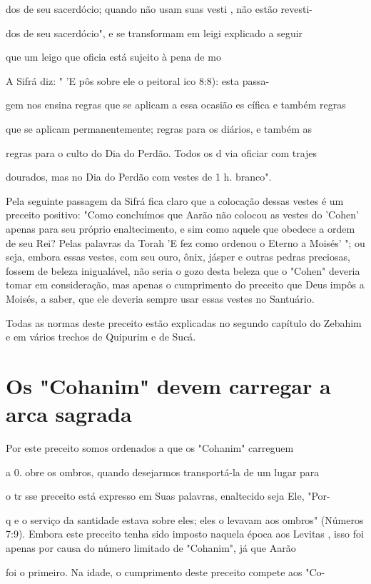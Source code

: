 \begin{itemize}
\begin{enumrate}
\begin{itemize}
\begin{itemize}
dos de seu sacerdócio; quando não usam suas vesti , não estão revesti-

dos de seu sacerdócio", e se transformam em leigi explicado a seguir

que um leigo que oficia está sujeito à pena de mo

A Sifrá diz: " 'E pôs sobre ele o peitoral ico 8:8): esta passa-


gem nos ensina regras que se aplicam a essa ocasião es cífica e também
regras


que se aplicam permanentemente; regras para os diários, e também as

regras para o culto do Dia do Perdão. Todos os d via oficiar com trajes

dourados, mas no Dia do Perdão com vestes de 1 h. branco".

Pela seguinte passagem da Sifrá fica claro que a colocação dessas
ves­tes é um preceito positivo: "Como concluímos que Aarão não colocou
as ves­tes do 'Cohen' apenas para seu próprio enaltecimento, e sim como
aquele que obedece a ordem de seu Rei? Pelas palavras da Torah 'E fez
como ordenou o Eterno a Moisés' "; ou seja, embora essas vestes, com seu
ouro, ônix, jásper e outras pedras preciosas, fossem de beleza
inigualável, não seria o gozo desta beleza que o "Cohen" deveria tomar
em consideração, mas apenas o cumpri­mento do preceito que Deus impôs a
Moisés, a saber, que ele deveria sempre usar essas vestes no Santuário.

Todas as normas deste preceito estão explicadas no segundo capítu­lo do
Zebahim e em vários trechos de Quipurim e de Sucá.

\section{Os "Cohanim" devem carregar a arca sagrada}



Por este preceito somos ordenados a que os "Cohanim" carreguem


a 0. obre os ombros, quando desejarmos transportá-la
de um lugar para

o tr sse preceito está expresso em Suas palavras, enaltecido seja Ele,
"Por-


q e o serviço da santidade estava sobre eles; eles o levavam aos ombros"
(Números
7:9). Embora este preceito tenha sido imposto naquela época aos
Levitas
, isso foi apenas por causa do número limitado de "Cohanim", já que
Aarão


foi o primeiro. Na idade, o cumprimento deste preceito compete aos "Co-


\end{itemize}
\end{itemize}
\end{enumrate}
\end{itemize}
